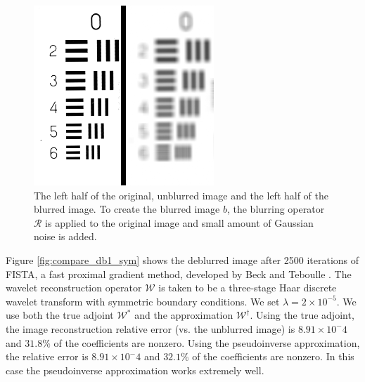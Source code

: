 \documentclass[journal]{IEEEtran}
\begin{document}
\begin{figure}
   \centering
   \includegraphics[width=0.8\columnwidth]{figures/resolution_blurred_figure.png}
   \caption{The left half of the original, unblurred image and the left half of the blurred image.  To create the blurred image $b$, the blurring operator $\mathcal{R}$ is applied to the original image and small amount of Gaussian noise is added.}
   \label{fig:original}
\end{figure}

Figure \ref{fig:compare_db1_sym} shows the deblurred image after 2500 iterations of FISTA, a fast proximal gradient method, developed by Beck and Teboulle \cite{beck_2009}.  The wavelet reconstruction operator $\mathcal{W}$ is taken to be a three-stage Haar discrete wavelet transform with symmetric boundary conditions.  We set $\lambda=2\times 10^{-5}$.  We use both the true adjoint $\mathcal{W}^\ast$ and the approximation $\mathcal{W}^\dagger$.  Using the true adjoint, the image reconstruction relative error (vs. the unblurred image) is $8.91\times10^-4$ and $31.8\%$ of the coefficients are nonzero.  Using the pseudoinverse approximation, the relative error is $8.91\times 10^-4$ and $32.1\%$ of the coefficients are nonzero.  In this case the pseudoinverse approximation works extremely well.

\end{document}

